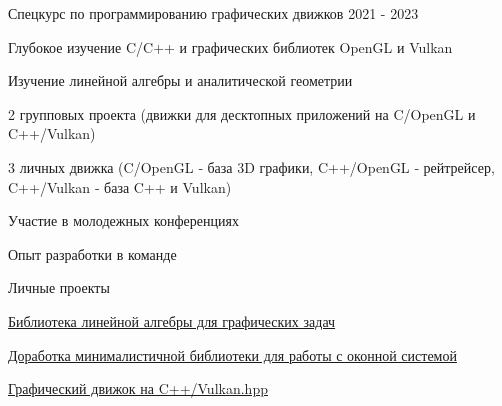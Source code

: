 

\begin{cventries}

  \cventry
    {} %
    {Спецкурс по программированию графических движков} %
    {} %
    {2021 - 2023} %
    {
      \begin{cvitems} %
        \item {Глубокое изучение C/C++ и графических библиотек OpenGL и Vulkan}
        \item {Изучение линейной алгебры и аналитической геометрии}
        \item {2 групповых проекта (движки для десктопных приложений на C/OpenGL и C++/Vulkan)}
        \item {3 личных движка (C/OpenGL ‐ база 3D графики, C++/OpenGL ‐ рейтрейсер, C++/Vulkan ‐ база C++ и Vulkan)}
        \item {Участие в молодежных конференциях}
        \item {Опыт разработки в команде}
      \end{cvitems}
    }

  \cventry
    {} %
    {Личные проекты} %
    {} %
    {} %
    {
      \begin{cvitems} %
        \item {\href{https://github.com/4J-company/mr-math}{Библиотека линейной алгебры для графических задач}}
        \item {\href{https://github.com/4J-company/mr-window}{Доработка минималистичной библиотеки для работы с оконной системой}}
        \item {\href{https://github.com/4J-company/mr-graphics}{Графический движок на C++/Vulkan.hpp}}
      \end{cvitems}
    }

\end{cventries}
